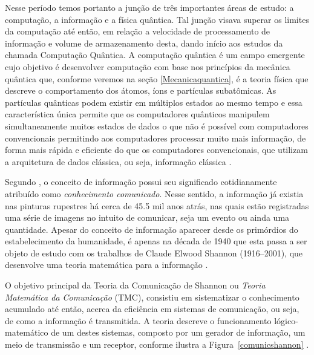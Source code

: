 \documentclass[11pt,oneside,brazil,hidelinks,article,sumario=tradicional,a4paper]{abntex2}
\begin{document}
Nesse período temos portanto a junção de três importantes áreas de estudo: a computação, a informação e a física quântica. Tal junção visava superar os limites da computação até então, em relação a velocidade de processamento de informação e volume de armazenamento desta, dando início aos estudos da chamada Computação Quântica. A computação quântica é um campo emergente cujo objetivo é desenvolver computação com base nos princípios da mecânica quântica que, conforme veremos na seção \ref{Mecanicaquantica}, é a teoria física que descreve o comportamento dos átomos, íons e partículas subatômicas. As partículas quânticas podem existir em múltiplos estados ao mesmo tempo e essa característica única permite que os computadores quânticos manipulem simultaneamente muitos estados de dados o que não é possível com computadores convencionais permitindo aos computadores processar muito mais informação, de forma mais rápida e eficiente do que os computadores convencionais, que utilizam a arquitetura de dados clássica, ou seja, informação clássica \cite{CompInfoQuantica}.

Segundo \textcite{conceitoinformação}, o conceito de informação possui seu significado cotidianamente atribuído como \textit{conhecimento comunicado}. Nesse sentido, a informação já existia nas pinturas rupestres há cerca de \num{45,5} mil anos atrás, nas quais estão registradas uma série de imagens no intuito de comunicar, seja um evento ou ainda uma quantidade. Apesar do conceito de informação aparecer desde os primórdios do estabelecimento da humanidade, é apenas na década de 1940 que esta passa a ser objeto de estudo com os trabalhos de Claude Elwood Shannon (1916--2001), que desenvolve uma teoria matemática para a informação \cite{CiênciaTransiçãoSeculosa}.

O objetivo principal da Teoria da Comunicação de Shannon ou \textit{Teoria Matemática da Comunicação} (TMC), consistiu em sistematizar o conhecimento acumulado até então, acerca da eficiência em sistemas de comunicação, ou seja, de como a informação é transmitida. A teoria descreve o funcionamento lógico-matemático de um destes sistemas, composto por um gerador de informação, um meio de transmissão e um receptor, conforme ilustra a Figura~\ref{comunicshannon} \cite{MTC}.
\end{document}
